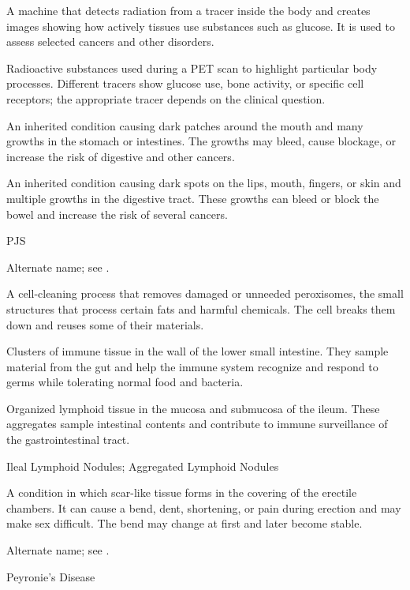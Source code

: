  A machine that detects radiation from a tracer inside the body and creates images showing how actively tissues use substances such as glucose. It is used to assess selected cancers and other disorders.

 Radioactive substances used during a PET scan to highlight particular body processes. Different tracers show glucose use, bone activity, or specific cell receptors; the appropriate tracer depends on the clinical question.

 An inherited condition causing dark patches around the mouth and many growths in the stomach or intestines. The growths may bleed, cause blockage, or increase the risk of digestive and other cancers.

 An inherited condition causing dark spots on the lips, mouth, fingers, or skin and multiple growths in the digestive tract. These growths can bleed or block the bowel and increase the risk of several cancers.

\synonyms
PJS

 Alternate name; see .

 A cell-cleaning process that removes damaged or unneeded peroxisomes, the small structures that process certain fats and harmful chemicals. The cell breaks them down and reuses some of their materials.

 Clusters of immune tissue in the wall of the lower small intestine. They sample material from the gut and help the immune system recognize and respond to germs while tolerating normal food and bacteria.

 Organized lymphoid tissue in the mucosa and submucosa of the ileum. These aggregates sample intestinal contents and contribute to immune surveillance of the gastrointestinal tract.

\synonyms
Ileal Lymphoid Nodules; Aggregated Lymphoid Nodules

 A condition in which scar-like tissue forms in the covering of the erectile chambers. It can cause a bend, dent, shortening, or pain during erection and may make sex difficult. The bend may change at first and later become stable.

 Alternate name; see .

\synonyms
Peyronie’s Disease

